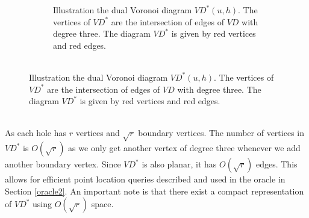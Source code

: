 \begin{figure}
\begin{subfigure}[b]{0.45\textwidth}
    \caption{Illustration the dual Voronoi diagram $VD^*(u,h)$. The vertices of
      $VD^*$ are the intersection of edges of $VD$ with degree three. The diagram $VD^*$
    is given by red vertices and red edges.\\ \\}
    \label{awvd2}
  \end{subfigure}
  \label{awvd}
\end{figure}
As each hole has $r$ vertices and
$\sqrt{r}$ boundary vertices. The number of vertices in $VD^*$ is $O(\sqrt{r})$ as we
only get another vertex of degree three whenever we add another boundary vertex. Since
$VD^*$ is also planar, it has $O(\sqrt{r})$ edges. This allows for efficient point
location queries described and used in the oracle in Section \ref{oracle2}. An important
note is that there exist a compact representation of $VD^*$ using $O(\sqrt{r})$ space.
